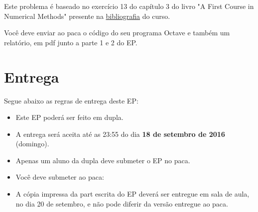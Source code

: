 \documentclass[12pt]{article}
\begin{document}
Este problema é baseado no exercício 13 do capítulo 3 do livro
"A First Course in Numerical Methods" presente na 
\href{http://ime.usp.br/~egbirgin/courses/mac210/biblio.html}{bibliografia} do
curso.

Você deve enviar ao paca o código do seu programa Octave e também um 
relatório, em pdf junto a parte 1 e 2 do EP.

\section{Entrega}
Segue abaixo as regras de entrega deste EP:
\begin{itemize}
    \item{Este EP poderá ser feito em dupla.}
    \item{A entrega será aceita até as 23:55 do dia \textbf{18 de
            setembro de 2016} (domingo).}
    \item{Apenas um aluno da dupla deve submeter o EP no paca.} 
    \item{Você deve submeter ao paca:}
    \item{A cópia impressa da part escrita do EP deverá ser entregue em 
            sala de aula, no dia 20 de setembro, e não pode diferir da 
            versão entregue ao paca.}
\end{itemize}
\end{document}
